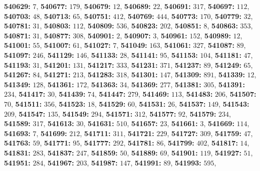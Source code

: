 \textsf{\bfseries 540629:} $7$, \textsf{\bfseries 540677:} $179$, \textsf{\bfseries 540679:} $12$, \textsf{\bfseries 540689:} $22$, \textsf{\bfseries 540691:} $317$, \textsf{\bfseries 540697:} $112$, \textsf{\bfseries 540703:} $48$, \textsf{\bfseries 540713:} $65$, \textsf{\bfseries 540751:} $412$, \textsf{\bfseries 540769:} $444$, \textsf{\bfseries 540773:} $170$, \textsf{\bfseries 540779:} $32$, \textsf{\bfseries 540781:} $31$, \textsf{\bfseries 540803:} $112$, \textsf{\bfseries 540809:} $536$, \textsf{\bfseries 540823:} $202$, \textsf{\bfseries 540851:} $8$, \textsf{\bfseries 540863:} $353$, \textsf{\bfseries 540871:} $31$, \textsf{\bfseries 540877:} $308$, \textsf{\bfseries 540901:} $2$, \textsf{\bfseries 540907:} $3$, \textsf{\bfseries 540961:} $152$, \textsf{\bfseries 540989:} $12$, \textsf{\bfseries 541001:} $55$, \textsf{\bfseries 541007:} $61$, \textsf{\bfseries 541027:} $7$, \textsf{\bfseries 541049:} $163$, \textsf{\bfseries 541061:} $327$, \textsf{\bfseries 541087:} $89$, \textsf{\bfseries 541097:} $246$, \textsf{\bfseries 541129:} $146$, \textsf{\bfseries 541133:} $28$, \textsf{\bfseries 541141:} $95$, \textsf{\bfseries 541153:} $104$, \textsf{\bfseries 541181:} $47$, \textsf{\bfseries 541193:} $31$, \textsf{\bfseries 541201:} $131$, \textsf{\bfseries 541217:} $333$, \textsf{\bfseries 541231:} $371$, \textsf{\bfseries 541237:} $89$, \textsf{\bfseries 541249:} $65$, \textsf{\bfseries 541267:} $84$, \textsf{\bfseries 541271:} $213$, \textsf{\bfseries 541283:} $318$, \textsf{\bfseries 541301:} $147$, \textsf{\bfseries 541309:} $891$, \textsf{\bfseries 541339:} $12$, \textsf{\bfseries 541349:} $128$, \textsf{\bfseries 541361:} $172$, \textsf{\bfseries 541363:} $34$, \textsf{\bfseries 541369:} $277$, \textsf{\bfseries 541381:} $305$, \textsf{\bfseries 541391:} $234$, \textsf{\bfseries 541417:} $30$, \textsf{\bfseries 541439:} $74$, \textsf{\bfseries 541447:} $279$, \textsf{\bfseries 541469:} $113$, \textsf{\bfseries 541483:} $206$, \textsf{\bfseries 541507:} $70$, \textsf{\bfseries 541511:} $356$, \textsf{\bfseries 541523:} $18$, \textsf{\bfseries 541529:} $60$, \textsf{\bfseries 541531:} $26$, \textsf{\bfseries 541537:} $149$, \textsf{\bfseries 541543:} $209$, \textsf{\bfseries 541547:} $135$, \textsf{\bfseries 541549:} $294$, \textsf{\bfseries 541571:} $312$, \textsf{\bfseries 541577:} $92$, \textsf{\bfseries 541579:} $234$, \textsf{\bfseries 541589:} $317$, \textsf{\bfseries 541613:} $30$, \textsf{\bfseries 541631:} $510$, \textsf{\bfseries 541657:} $23$, \textsf{\bfseries 541661:} $3$, \textsf{\bfseries 541669:} $114$, \textsf{\bfseries 541693:} $7$, \textsf{\bfseries 541699:} $212$, \textsf{\bfseries 541711:} $311$, \textsf{\bfseries 541721:} $229$, \textsf{\bfseries 541727:} $309$, \textsf{\bfseries 541759:} $47$, \textsf{\bfseries 541763:} $59$, \textsf{\bfseries 541771:} $95$, \textsf{\bfseries 541777:} $292$, \textsf{\bfseries 541781:} $86$, \textsf{\bfseries 541799:} $402$, \textsf{\bfseries 541817:} $14$, \textsf{\bfseries 541831:} $283$, \textsf{\bfseries 541837:} $247$, \textsf{\bfseries 541859:} $50$, \textsf{\bfseries 541889:} $69$, \textsf{\bfseries 541901:} $119$, \textsf{\bfseries 541927:} $51$, \textsf{\bfseries 541951:} $284$, \textsf{\bfseries 541967:} $203$, \textsf{\bfseries 541987:} $147$, \textsf{\bfseries 541991:} $89$, \textsf{\bfseries 541993:} $595$, 
